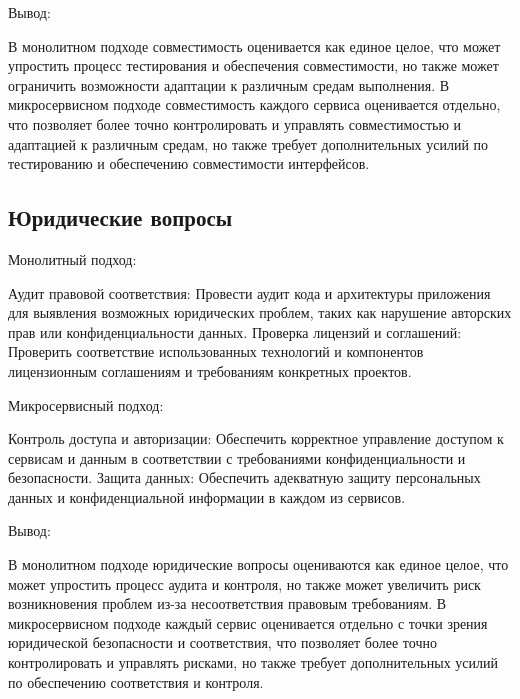 Вывод:

    В монолитном подходе совместимость оценивается как единое целое, что может упростить процесс тестирования и обеспечения совместимости, но также может ограничить возможности адаптации к различным средам выполнения.
    В микросервисном подходе совместимость каждого сервиса оценивается отдельно, что позволяет более точно контролировать и управлять совместимостью и адаптацией к различным средам, но также требует дополнительных усилий по тестированию и обеспечению совместимости интерфейсов.

\subsection{Юридические вопросы}

Монолитный подход:

    Аудит правовой соответствия: Провести аудит кода и архитектуры приложения для выявления возможных юридических проблем, таких как нарушение авторских прав или конфиденциальности данных.
    Проверка лицензий и соглашений: Проверить соответствие использованных технологий и компонентов лицензионным соглашениям и требованиям конкретных проектов.

Микросервисный подход:

    Контроль доступа и авторизации: Обеспечить корректное управление доступом к сервисам и данным в соответствии с требованиями конфиденциальности и безопасности.
    Защита данных: Обеспечить адекватную защиту персональных данных и конфиденциальной информации в каждом из сервисов.

Вывод:

    В монолитном подходе юридические вопросы оцениваются как единое целое, что может упростить процесс аудита и контроля, но также может увеличить риск возникновения проблем из-за несоответствия правовым требованиям.
    В микросервисном подходе каждый сервис оценивается отдельно с точки зрения юридической безопасности и соответствия, что позволяет более точно контролировать и управлять рисками, но также требует дополнительных усилий по обеспечению соответствия и контроля.














